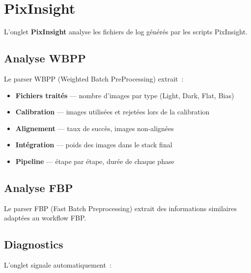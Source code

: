 \documentclass[a4paper,11pt]{article}
\begin{document}
\section{PixInsight}
\label{sec:pixinsight}

\begin{tcolorbox}[
    enhanced, colback=successgreen!8, colframe=successgreen!60,
    coltitle=white, fonttitle=\bfseries,
    title={NOUVEAU dans v1.2.0}
]
L'onglet \textbf{PixInsight} analyse les fichiers de log g\'{e}n\'{e}r\'{e}s par les scripts PixInsight.
\end{tcolorbox}

\subsection{Analyse WBPP}

Le parser WBPP (Weighted Batch PreProcessing) extrait~:

\begin{itemize}
    \item \textbf{Fichiers trait\'{e}s} --- nombre d'images par type (Light, Dark, Flat, Bias)
    \item \textbf{Calibration} --- images utilis\'{e}es et rejet\'{e}es lors de la calibration
    \item \textbf{Alignement} --- taux de succ\`{e}s, images non-align\'{e}es
    \item \textbf{Int\'{e}gration} --- poids des images dans le stack final
    \item \textbf{Pipeline} --- \'{e}tape par \'{e}tape, dur\'{e}e de chaque phase
\end{itemize}

\subsection{Analyse FBP}

Le parser FBP (Fast Batch Preprocessing) extrait des informations similaires adapt\'{e}es au workflow FBP.

\subsection{Diagnostics}

L'onglet signale automatiquement~:
\end{document}
